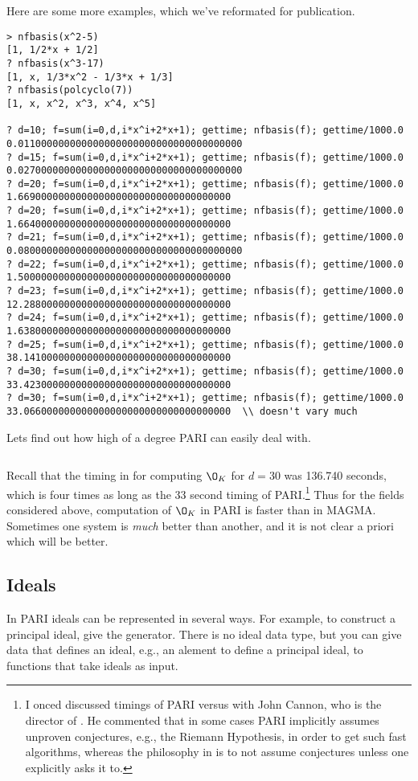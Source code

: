 Here are some more examples, which we've reformated for publication.
\begin{verbatim}
> nfbasis(x^2-5)
[1, 1/2*x + 1/2]
? nfbasis(x^3-17)
[1, x, 1/3*x^2 - 1/3*x + 1/3]
? nfbasis(polcyclo(7))
[1, x, x^2, x^3, x^4, x^5]

? d=10; f=sum(i=0,d,i*x^i+2*x+1); gettime; nfbasis(f); gettime/1000.0
0.011000000000000000000000000000000000000
? d=15; f=sum(i=0,d,i*x^i+2*x+1); gettime; nfbasis(f); gettime/1000.0
0.027000000000000000000000000000000000000
? d=20; f=sum(i=0,d,i*x^i+2*x+1); gettime; nfbasis(f); gettime/1000.0
1.6690000000000000000000000000000000000
? d=20; f=sum(i=0,d,i*x^i+2*x+1); gettime; nfbasis(f); gettime/1000.0
1.6640000000000000000000000000000000000
? d=21; f=sum(i=0,d,i*x^i+2*x+1); gettime; nfbasis(f); gettime/1000.0
0.080000000000000000000000000000000000000
? d=22; f=sum(i=0,d,i*x^i+2*x+1); gettime; nfbasis(f); gettime/1000.0
1.5000000000000000000000000000000000000
? d=23; f=sum(i=0,d,i*x^i+2*x+1); gettime; nfbasis(f); gettime/1000.0
12.288000000000000000000000000000000000
? d=24; f=sum(i=0,d,i*x^i+2*x+1); gettime; nfbasis(f); gettime/1000.0
1.6380000000000000000000000000000000000
? d=25; f=sum(i=0,d,i*x^i+2*x+1); gettime; nfbasis(f); gettime/1000.0
38.141000000000000000000000000000000000
? d=30; f=sum(i=0,d,i*x^i+2*x+1); gettime; nfbasis(f); gettime/1000.0
33.423000000000000000000000000000000000
? d=30; f=sum(i=0,d,i*x^i+2*x+1); gettime; nfbasis(f); gettime/1000.0
33.066000000000000000000000000000000000  \\ doesn't vary much
\end{verbatim}
Lets find out how high of a degree PARI can easily deal with.
\begin{verbatim}
\end{verbatim}

Recall that the timing in \magma{} for computing $\O_K$ for
$d=30$ was 136.740 seconds, which is four times as long as the
33 second timing of PARI.\footnote{I onced discussed 
timings of PARI versus \magma{} with John Cannon, who is
the director of \magma{}.
He commented that in some cases PARI implicitly assumes unproven conjectures,
e.g., the Riemann Hypothesis,
in order to get such fast algorithms, whereas the philosophy in \magma{} 
is to not assume conjectures unless one explicitly asks it to.}
  Thus for the fields
considered above, computation of $\O_K$ in PARI is faster
than in MAGMA. Sometimes one system is {\em much}
better than another, and it is not clear a priori which will be
better.

\subsection{Ideals}
In PARI ideals can be represented in several ways.   For example, to construct
a principal ideal, give the generator.  There is no ideal data type, but you 
can give data that defines an ideal, e.g., an alement to define a principal ideal,
to functions that take ideals as input.

